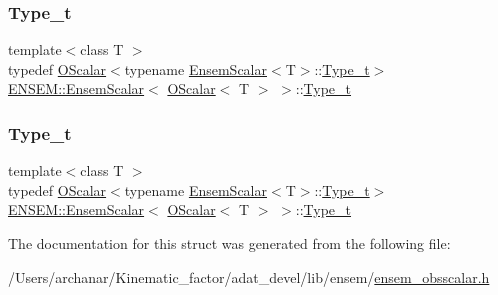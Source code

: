 \subsubsection{\texorpdfstring{Type\_t}{Type\_t}\hspace{0.1cm}{\footnotesize\ttfamily [1/2]}}
{\footnotesize\ttfamily template$<$class T $>$ \\
typedef \mbox{\hyperlink{classENSEM_1_1OScalar}{O\+Scalar}}$<$typename \mbox{\hyperlink{structENSEM_1_1EnsemScalar}{Ensem\+Scalar}}$<$T$>$\+::\mbox{\hyperlink{structENSEM_1_1EnsemScalar_3_01OScalar_3_01T_01_4_01_4_ae59bb2dba9a4ddf192256b4beaf9a856}{Type\+\_\+t}}$>$ \mbox{\hyperlink{structENSEM_1_1EnsemScalar}{E\+N\+S\+E\+M\+::\+Ensem\+Scalar}}$<$ \mbox{\hyperlink{classENSEM_1_1OScalar}{O\+Scalar}}$<$ T $>$ $>$\+::\mbox{\hyperlink{structENSEM_1_1EnsemScalar_3_01OScalar_3_01T_01_4_01_4_ae59bb2dba9a4ddf192256b4beaf9a856}{Type\+\_\+t}}}

\mbox{\label{structENSEM_1_1EnsemScalar_3_01OScalar_3_01T_01_4_01_4_ae59bb2dba9a4ddf192256b4beaf9a856}} 
\subsubsection{\texorpdfstring{Type\_t}{Type\_t}\hspace{0.1cm}{\footnotesize\ttfamily [2/2]}}
{\footnotesize\ttfamily template$<$class T $>$ \\
typedef \mbox{\hyperlink{classENSEM_1_1OScalar}{O\+Scalar}}$<$typename \mbox{\hyperlink{structENSEM_1_1EnsemScalar}{Ensem\+Scalar}}$<$T$>$\+::\mbox{\hyperlink{structENSEM_1_1EnsemScalar_3_01OScalar_3_01T_01_4_01_4_ae59bb2dba9a4ddf192256b4beaf9a856}{Type\+\_\+t}}$>$ \mbox{\hyperlink{structENSEM_1_1EnsemScalar}{E\+N\+S\+E\+M\+::\+Ensem\+Scalar}}$<$ \mbox{\hyperlink{classENSEM_1_1OScalar}{O\+Scalar}}$<$ T $>$ $>$\+::\mbox{\hyperlink{structENSEM_1_1EnsemScalar_3_01OScalar_3_01T_01_4_01_4_ae59bb2dba9a4ddf192256b4beaf9a856}{Type\+\_\+t}}}



The documentation for this struct was generated from the following file\+:\begin{DoxyCompactItemize}
\item 
/\+Users/archanar/\+Kinematic\+\_\+factor/adat\+\_\+devel/lib/ensem/\mbox{\hyperlink{lib_2ensem_2ensem__obsscalar_8h}{ensem\+\_\+obsscalar.\+h}}\end{DoxyCompactItemize}
